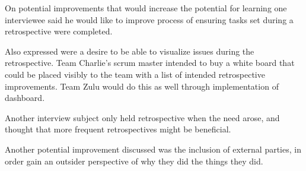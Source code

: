 \label{question-18}
On potential improvements that would increase the potential for learning one interviewee said he would like to improve process of ensuring tasks set during a retrospective were completed. 

Also expressed were a desire to be able to visualize issues during the retrospective. Team Charlie's scrum master intended to buy a white board that could be placed visibly to the team with a list of intended retrospective improvements. Team Zulu would do this as well through implementation of dashboard. 

Another interview subject only held retrospective when the need arose, and thought that more frequent retrospectives might be beneficial. 

Another potential improvement discussed was the inclusion of external parties, in order gain an outsider perspective of why they did the things they did. 
